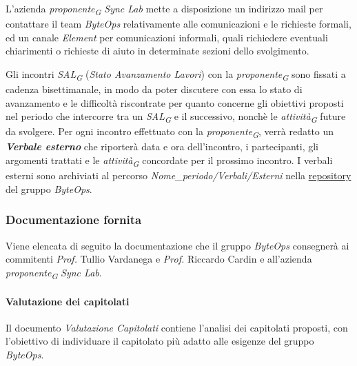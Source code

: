 \vspace{0.2cm}

L'azienda \textit{proponente}\textsubscript{\textit{G}} \textit{Sync Lab} mette a disposizione un indirizzo mail per contattare il team \textit{ByteOps} relativamente alle comunicazioni e le richieste formali, ed un canale \textit{Element} per comunicazioni informali, quali richiedere eventuali chiarimenti o richieste di aiuto in determinate sezioni dello svolgimento.

\vspace{0.2cm}

Gli incontri \textit{SAL}\textsubscript{\textit{G}} (\textit{Stato Avanzamento Lavori}) con la \textit{proponente}\textsubscript{\textit{G}} sono fissati a cadenza bisettimanale, in modo da poter discutere con essa lo stato di avanzamento e le difficoltà riscontrate per quanto concerne gli obiettivi proposti nel periodo che intercorre tra un \textit{SAL}\textsubscript{\textit{G}} e il successivo, nonchè le \textit{attività}\textsubscript{\textit{G}} future da svolgere.
Per ogni incontro effettuato con la \textit{proponente}\textsubscript{\textit{G}}, verrà redatto un \textit{\textbf{Verbale esterno}} che riporterà data e ora dell'incontro, i partecipanti, gli argomenti trattati e le \textit{attività}\textsubscript{\textit{G}} concordate per il prossimo incontro.
I verbali esterni sono archiviati al percorso \textit{Nome\_periodo/Verbali/Esterni} nella \href{https://github.com/ByteOps-swe/Documents}{repository} del gruppo \textit{ByteOps}.

\subsubsection {Documentazione fornita}
Viene elencata di seguito la documentazione che il gruppo \textit{ByteOps} consegnerà ai commitenti \textit{Prof.} Tullio Vardanega e \textit{Prof.} Riccardo Cardin e all'azienda \textit{proponente}\textsubscript{\textit{G}} \textit{Sync Lab}.

\paragraph{Valutazione dei capitolati}
Il documento \textit{Valutazione Capitolati} contiene l'analisi dei capitolati proposti, con l'obiettivo di individuare il capitolato più adatto alle esigenze del gruppo \textit{ByteOps}. 

